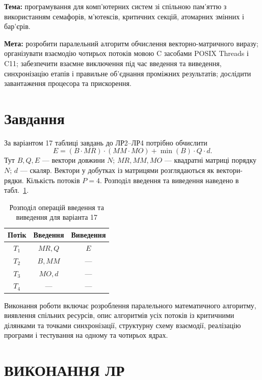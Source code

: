 \documentclass[12pt,a4paper]{article}
\begin{document}
\noindent\textbf{Тема:} програмування для комп’ютерних систем зі спільною
пам’яттю з використанням семафорів, м’ютексів, критичних секцій,
атомарних змінних і бар’єрів.

\medskip
\noindent\textbf{Мета:} розробити паралельний алгоритм обчислення
векторно-матричного виразу; організувати взаємодію чотирьох потоків мовою C
засобами POSIX Threads і C11; забезпечити взаємне виключення під час
введення та виведення, синхронізацію етапів і правильне об’єднання
проміжних результатів; дослідити завантаження процесора та прискорення.

\section{Завдання}

За варіантом 17 таблиці завдань до ЛР2--ЛР4 потрібно обчислити
\begin{equation}
 E=(B\cdot MR)\cdot(MM\cdot MO)+\min(B)\cdot Q\cdot d.
 \label{eq:task}
\end{equation}
Тут $B,Q,E$ --- вектори довжини $N$; $MR,MM,MO$ --- квадратні матриці
порядку $N$; $d$ --- скаляр. Вектори у добутках із матрицями
розглядаються як вектори-рядки. Кількість потоків $P=4$.
Розподіл введення та виведення наведено в табл.~\ref{tab:io}.

\begin{table}[H]
\centering\renewcommand{\arraystretch}{1.2}
\begin{tabular}{|c|c|c|}\hline
\textbf{Потік} & \textbf{Введення} & \textbf{Виведення}\\\hline
$T_1$ & $MR,Q$ & $E$\\\hline
$T_2$ & $B,MM$ & ---\\\hline
$T_3$ & $MO,d$ & ---\\\hline
$T_4$ & --- & ---\\\hline
\end{tabular}
\caption{Розподіл операцій введення та виведення для варіанта 17}
\label{tab:io}
\end{table}

Виконання роботи включає розроблення паралельного математичного
алгоритму, виявлення спільних ресурсів, опис алгоритмів усіх потоків із
критичними ділянками та точками синхронізації, структурну схему взаємодії,
реалізацію програми і тестування на одному та чотирьох ядрах.

\section{ВИКОНАННЯ ЛР}
\end{document}
